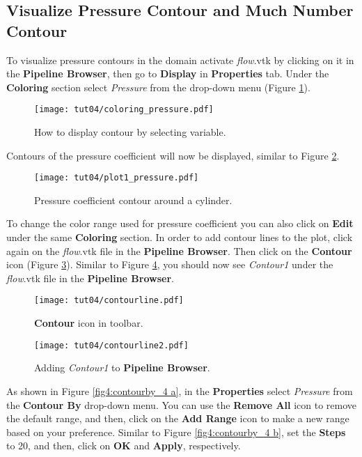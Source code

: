 \subsection{Visualize Pressure Contour and Much Number Contour}
To visualize pressure contours in the domain activate \textit{flow}.vtk by clicking on it in the \textbf{Pipeline Browser}, then go to \textbf{Display} in \textbf{Properties} tab. Under the \textbf{Coloring} section select \textit{Pressure} from the drop-down menu (Figure \ref{fig4:pressure_coloring_4}).
\begin{figure}[htbp]
    \centering
    \texttt{[image: tut04/coloring\_pressure.pdf]}
    \caption{How to display contour by selecting variable.}
    \label{fig4:pressure_coloring_4}
\end{figure}
Contours of the pressure coefficient will now be displayed, similar to Figure \ref{fig4:pressure_plot1_4}.
\begin{figure}[htbp]
    \centering
    \texttt{[image: tut04/plot1\_pressure.pdf]}
    \caption{Pressure coefficient contour around a cylinder.}
    \label{fig4:pressure_plot1_4}
\end{figure}
To change the color range used for pressure coefficient you can also click on \textbf{Edit} under the same \textbf{Coloring} section. In order to add contour lines to the plot, click again on the \textit{flow}.vtk file in the \textbf{Pipeline Browser}. Then click on the \textbf{Contour} icon (Figure \ref{fig4:contourline1_4}). Similar to Figure \ref{fig4:contourline2_4}, you should now see \textit{Contour1} under the \textit{flow}.vtk file in the \textbf{Pipeline Browser}. 
\begin{figure}[htbp]
    \centering
    \texttt{[image: tut04/contourline.pdf]}
    \caption{\textbf{Contour} icon in toolbar.}
    \label{fig4:contourline1_4}
\end{figure}
\begin{figure}[htbp]
    \centering
    \texttt{[image: tut04/contourline2.pdf]}
    \caption{Adding \textit{Contour1} to \textbf{Pipeline Browser}.}
    \label{fig4:contourline2_4}
\end{figure}
As shown in Figure \ref{fig4:contourby_4 a}, in the \textbf{Properties} select \textit{Pressure} from the \textbf{Contour By} drop-down menu. You can use the \textbf{Remove All} icon to remove the default range, and then, click on the \textbf{Add Range} icon to make a new range based on your preference. Similar to Figure \ref{fig4:contourby_4 b}, set the \textbf{Steps} to 20, and then, click on \textbf{OK} and \textbf{Apply}, respectively.
